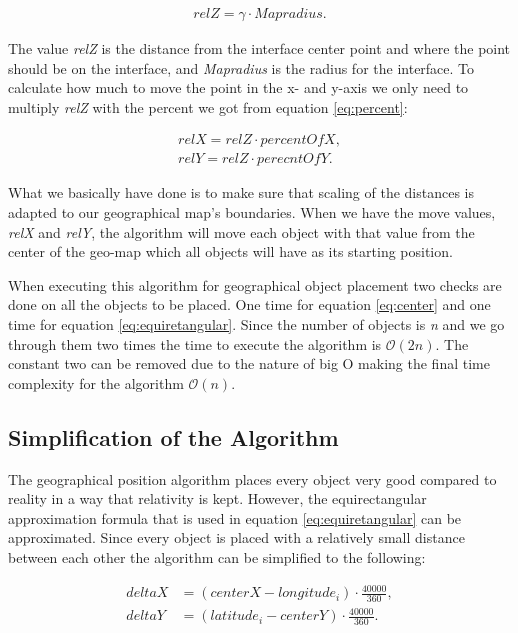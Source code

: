 \begin{align*}
relZ = \gamma \cdot Mapradius.
\end{align*}

The value \textit{relZ} is the distance from the interface center point and where the point should be on the interface, and \textit{Mapradius} is the radius for the interface. To calculate how much to move the point in the x- and y-axis we only need to multiply \textit{relZ} with the percent we got from equation \ref{eq:percent}:

\begin{align*}
relX = relZ \cdot percentOfX, \\
relY = relZ \cdot perecntOfY.
\end{align*}

What we basically have done is to make sure that scaling of the distances is adapted to our geographical map's boundaries. When we have the move values, \textit{relX} and \textit{relY}, the algorithm will move each object with that value from the center of the geo-map which all objects will have as its starting position. 

When executing this algorithm for geographical object placement two checks are done on all the objects to be placed. One time for equation \ref{eq:center} and one time for equation \ref{eq:equiretangular}. Since the number of objects is \textit{n} and we go through them two times the time to execute the algorithm is $\mathcal{O}(2n)$. The constant two can be removed due to the nature of big O making the final time complexity for the algorithm $\mathcal{O}(n)$.



\subsection{Simplification of the Algorithm}
\label{sec:limacc}

The geographical position algorithm places every object very good compared to reality in a way that relativity is kept. However, the equirectangular approximation formula that is used in equation \ref{eq:equiretangular} can be approximated. Since every object is placed with a relatively small distance between each other the algorithm can be simplified to the following: 

\begin{align*}
deltaX &= (centerX-longitude_i)\cdot\frac{40000}{360}, \\
deltaY &= (latitude_i-centerY)\cdot\frac{40000}{360}. \\
\end{align*}

